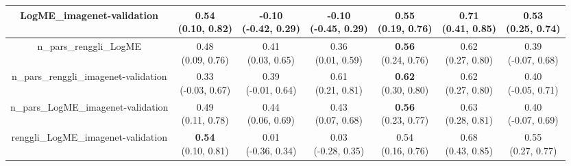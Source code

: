 \begin{table}[H]
\begin{tabular}{c|cccccc}
\hline
LogME_imagenet-validation & \makecell{0.54 \\[0pt] (0.10, 0.82)} & \makecell{-0.10 \\[0pt] (-0.42, 0.29)} & \makecell{-0.10 \\[0pt] (-0.45, 0.29)} & \makecell{\textbf{0.55} \\[0pt] (0.19, 0.76)} & \makecell{0.71 \\[0pt] (0.41, 0.85)} & \makecell{0.53 \\[0pt] (0.25, 0.74)} \\
\hline
n_pars_renggli_LogME & \makecell{0.48 \\[0pt] (0.09, 0.76)} & \makecell{0.41 \\[0pt] (0.03, 0.65)} & \makecell{0.36 \\[0pt] (0.01, 0.59)} & \makecell{\textbf{0.56} \\[0pt] (0.24, 0.76)} & \makecell{0.62 \\[0pt] (0.27, 0.80)} & \makecell{0.39 \\[0pt] (-0.07, 0.68)} \\
\hline
n_pars_renggli_imagenet-validation & \makecell{0.33 \\[0pt] (-0.03, 0.67)} & \makecell{0.39 \\[0pt] (-0.01, 0.64)} & \makecell{0.61 \\[0pt] (0.21, 0.81)} & \makecell{\textbf{0.62} \\[0pt] (0.30, 0.80)} & \makecell{0.62 \\[0pt] (0.27, 0.80)} & \makecell{0.40 \\[0pt] (-0.05, 0.71)} \\
\hline
n_pars_LogME_imagenet-validation & \makecell{0.49 \\[0pt] (0.11, 0.78)} & \makecell{0.44 \\[0pt] (0.06, 0.69)} & \makecell{0.43 \\[0pt] (0.07, 0.68)} & \makecell{\textbf{0.56} \\[0pt] (0.23, 0.77)} & \makecell{0.63 \\[0pt] (0.28, 0.81)} & \makecell{0.40 \\[0pt] (-0.07, 0.69)} \\
\hline
renggli_LogME_imagenet-validation & \makecell{\textbf{0.54} \\[0pt] (0.10, 0.81)} & \makecell{0.01 \\[0pt] (-0.36, 0.34)} & \makecell{0.03 \\[0pt] (-0.28, 0.35)} & \makecell{0.54 \\[0pt] (0.16, 0.76)} & \makecell{0.68 \\[0pt] (0.43, 0.85)} & \makecell{0.55 \\[0pt] (0.27, 0.77)} \\

\end{tabular}
\end{table}
